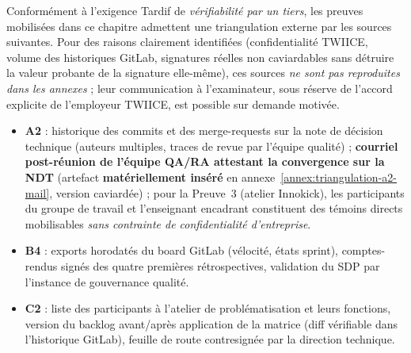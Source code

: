 \medskip

\begin{tcolorbox}[enhanced, breakable, colback=green!5, colframe=green!45!black, boxrule=0.5pt, arc=4pt,
  left=10pt, right=10pt, top=8pt, bottom=8pt,
  title={\textbf{\small Triangulation externe : disponible mais non mobilisée dans le corps du portfolio}},
  fonttitle=\small\bfseries, coltitle=white, attach boxed title to top left={yshift=-2mm, xshift=4mm},
  boxed title style={colback=green!45!black, arc=3pt, boxrule=0pt}]
\small
Conformément à l'exigence Tardif de \emph{vérifiabilité par un tiers}, les preuves mobilisées dans ce chapitre admettent une triangulation externe par les sources suivantes. Pour des raisons clairement identifiées (confidentialité TWIICE, volume des historiques GitLab, signatures réelles non caviardables sans détruire la valeur probante de la signature elle-même), ces sources \emph{ne sont pas reproduites dans les annexes} ; leur communication à l'examinateur, sous réserve de l'accord explicite de l'employeur TWIICE, est possible sur demande motivée.

\begin{itemize}
  \item \textbf{A2} : historique des commits et des merge-requests sur la note de décision technique (auteurs multiples, traces de revue par l'équipe qualité) ; \textbf{courriel post-réunion de l'équipe QA/RA attestant la convergence sur la NDT} (artefact \textbf{matériellement inséré} en annexe~\ref{annex:triangulation-a2-mail}, version caviardée) ; pour la Preuve~3 (atelier Innokick), les participants du groupe de travail et l'enseignant encadrant constituent des témoins directs mobilisables \emph{sans contrainte de confidentialité d'entreprise}.
  \item \textbf{B4} : exports horodatés du board GitLab (vélocité, états sprint), comptes-rendus signés des quatre premières rétrospectives, validation du SDP par l'instance de gouvernance qualité.
  \item \textbf{C2} : liste des participants à l'atelier de problématisation et leurs fonctions, version du backlog avant/après application de la matrice (diff vérifiable dans l'historique GitLab), feuille de route contresignée par la direction technique.
\end{itemize}


\end{tcolorbox}
